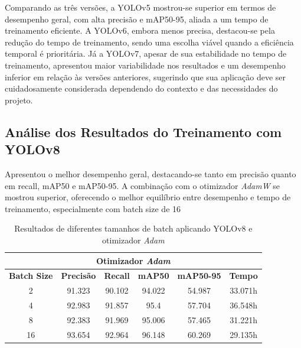 Comparando as três versões, a YOLOv5 mostrou-se superior em termos de desempenho geral, com alta precisão e mAP50-95, aliada a um tempo de treinamento eficiente. A YOLOv6, embora menos precisa, destacou-se pela redução do tempo de treinamento, sendo uma escolha viável quando a eficiência temporal é prioritária. Já a YOLOv7, apesar de sua estabilidade no tempo de treinamento, apresentou maior variabilidade nos resultados e um desempenho inferior em relação às versões anteriores, sugerindo que sua aplicação deve ser cuidadosamente considerada dependendo do contexto e das necessidades do projeto.

\subsection{Análise dos Resultados do Treinamento com YOLOv8}

Apresentou o melhor desempenho geral, destacando-se tanto em precisão quanto em recall, mAP50 e mAP50-95. A combinação com o otimizador \textit{AdamW} se mostrou superior, oferecendo o melhor equilíbrio entre desempenho e tempo de treinamento, especialmente com batch size de 16

\begin{table}[!hbt]
    \centering
    \begin{tabular}{|c|c|c|c|c|c|}
    \hline
    \multicolumn{6}{|c|}{\textbf{Otimizador \textit{Adam}}} \\ \hline
    \textbf{Batch Size} & \textbf{Precisão} & \textbf{Recall} & \textbf{mAP50} & \textbf{mAP50-95} & \textbf{Tempo} \\ \hline
    2                   & 91.323                       & 90.102                     & 94.022                     & 54.987                        & 33.071h                         \\ \hline
    4                   & 92.983                       & 91.857                     & 95.4                       & 57.704                        & 36.548h                         \\ \hline
    8                   & 92.383                       & 91.969                     & 95.006                     & 57.465                        & 31.221h                         \\ \hline
    16                  & 93.654                       & 92.964                     & 96.148                     & 60.269                        & 29.135h                         \\ \hline
    \end{tabular}
    \caption{Resultados de diferentes tamanhos de batch aplicando YOLOv8 e otimizador \textit{Adam}}
    \label{tab:yolov8-adm}
\end{table}

